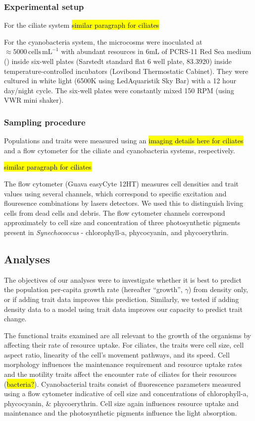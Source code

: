 \documentclass{getwriting}
\begin{document}
\subsubsection{Experimental setup}

For the ciliate system \hl{similar paragraph for ciliates}

For the cyanobacteria system, the microcosms were inoculated at $\approx 5000 \, \mathrm{cells} \, \mathrm{mL}^{-1}$ with abundant resources in $6 \mathrm{mL}$ of PCRS-11 Red Sea medium (\cite{Rippka2000}) inside six-well plates (Sarstedt standard flat 6 well plate, 83.3920) inside temperature-controlled incubators (Lovibond Thermostatic Cabinet). They were cultured in white light (6500K using LedAquaristik Sky Bar) with a 12 hour day/night cycle. The six-well plates were constantly mixed 150 RPM (using VWR mini shaker).

\subsubsection{Sampling procedure}

Populations and traits were measured using an \hl{imaging details here for ciliates} and a flow cytometer for the ciliate and cyanobacteria systems, respectively.

\hl{similar paragraph for ciliates}

The flow cytometer (Guava easyCyte 12HT) measures cell densities and trait values using several channels, which correspond to specific excitation and flouresence combinations by lasers detectors. We used this to distinguish living cells from dead cells and debris. The flow cytometer channels correspond approximately to cell size and concentration of three photosynthetic pigments present in \textit{Synechococcus} - chlorophyll-a, phycocyanin, and phycoerythrin. 

\subsection{Analyses}

The objectives of our analyses were to investigate whether it is best to predict the population per-capita growth rate (hereafter ``growth'', $\gamma$) from density only, or if adding trait data improves this prediction. Similarly, we tested if adding density data to a model using trait data improves our capacity to predict trait change. 

The functional traits examined are all relevant to the growth of the organisms by affecting their rate of resource uptake. For ciliates, the traits were cell size, cell aspect ratio, linearity of the cell's movement pathways, and its speed. Cell morphology influences the maintenance requirement and resource uptake rates and the motility traits affect the encounter rate of ciliates for their resources (\hl{bacteria?}). Cyanobacterial traits consist of fluorescence parameters measured using a flow cytometer indicative of cell size and concentrations of chlorophyll-a, phycocyanin, \& phycoerythrin. Cell size again influences resource uptake and maintenance and the photosynthetic pigments influence the light absorption. 
\end{document}
